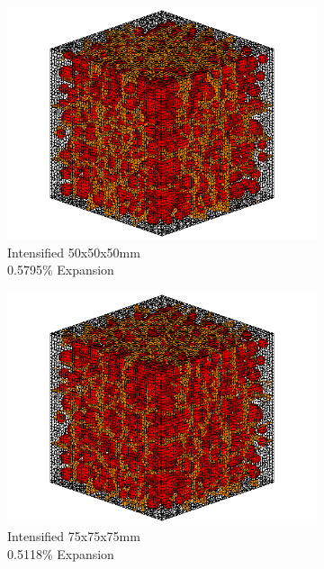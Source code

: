 \begin{figure}[ht!]
    \begin{subfigure}{.3\textwidth}
      \centering
      \includegraphics[width=.9\linewidth]{Files/exp_3D/DEF/A30X0C_3_c.png}
    \caption{Intensified 50x50x50mm \\  0.5795\% Expansion}
    \end{subfigure}%
    \begin{subfigure}{.3\textwidth}
      \centering
      \includegraphics[width=.9\linewidth]{Files/exp_3D/DEF/A30X-5C_3_c.png}
    \caption{Intensified 75x75x75mm  \\ 0.5118\% Expansion}
    \end{subfigure}
    \begin{subfigure}{.3\textwidth}
      \centering

\end{subfigure}
\end{figure}
